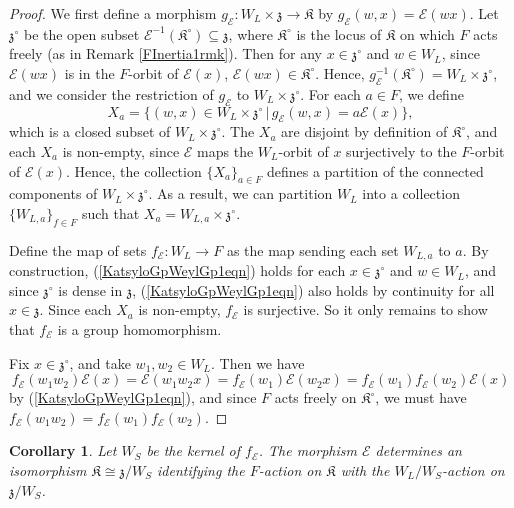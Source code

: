 \documentclass{amsart}
\newtheorem{corollary}[theorem]{Corollary}
\theoremstyle{remark}
\numberwithin{theorem}{section}
\numberwithin{equation}{section}
\begin{document}
\begin{proof}
We first define a morphism $g_{\mathcal E}:W_L \times \mathfrak{z} \rightarrow \mathfrak{K}$ by $g_{\mathcal E}(w,x) = \mathcal E(wx)$. Let $\mathfrak{z}^\circ$ be the open subset $\mathcal{E}^{-1}(\mathfrak{K}^\circ) \subseteq \mathfrak{z}$, where $\mathfrak{K}^\circ$ is the locus of $\mathfrak{K}$ on which $F$ acts freely (as in Remark \ref{FInertia1rmk}). Then for any $x \in \mathfrak{z}^\circ$ and $w \in W_L$, since $\mathcal E(wx)$ is in the $F$-orbit of $\mathcal E(x)$, $\mathcal E(wx) \in \mathfrak{K}^\circ$. Hence, $g_{\mathcal E}^{-1}(\mathfrak{K}^\circ) = W_L \times \mathfrak{z}^\circ$, and we consider the restriction of $g_{\mathcal E}$ to $W_L \times \mathfrak{z}^\circ$. For each $a \in F$, we define
\begin{equation}\label{KatsyloGpWeylGp2eqn}
    X_a = \{ (w,x) \in W_L \times \mathfrak{z}^\circ \, | \, g_{\mathcal E}(w,x) = a\mathcal E(x) \},
\end{equation}
which is a closed subset of $W_L \times \mathfrak{z}^\circ$. The $X_a$ are disjoint by definition of $\mathfrak{K}^\circ$, and each $X_a$ is non-empty, since $\mathcal E$ maps the $W_L$-orbit of $x$ surjectively to the $F$-orbit of $\mathcal E(x)$. Hence, the collection $\{X_a\}_{a \in F}$ defines a partition of the connected components of $W_L \times \mathfrak{z}^\circ$. As a result, we can partition $W_L$ into a collection $\{W_{L,a}\}_{f \in F}$ such that $X_a = W_{L,a} \times \mathfrak{z}^\circ$.

Define the map of sets $f_{\mathcal E}:W_L \rightarrow F$ as the map sending each set $W_{L,a}$ to $a$. By construction, (\ref{KatsyloGpWeylGp1eqn}) holds for each $x \in \mathfrak{z}^\circ$ and $w \in W_L$, and since $\mathfrak{z}^\circ$ is dense in $\mathfrak{z}$, (\ref{KatsyloGpWeylGp1eqn}) also holds by continuity for all $x \in \mathfrak{z}$. Since each $X_a$ is non-empty, $f_{\mathcal E}$ is surjective. So it only remains to show that $f_{\mathcal E}$ is a group homomorphism.

Fix $x \in \mathfrak{z}^\circ$, and take $w_1, w_2 \in W_L$. Then we have
$$
f_{\mathcal E}(w_1w_2)\mathcal E(x) = \mathcal E(w_1w_2x) = f_{\mathcal E}(w_1)\mathcal E(w_2x) = f_{\mathcal E}(w_1)f_{\mathcal E}(w_2)\mathcal E(x)
$$
by (\ref{KatsyloGpWeylGp1eqn}), and since $F$ acts freely on $\mathfrak{K}^\circ$, we must have $f_{\mathcal E}(w_1w_2)=f_{\mathcal E}(w_1)f_{\mathcal E}(w_2)$.
\end{proof}

\begin{corollary}\label{KatsyloGpWeylGpcor}
    Let $W_S$ be the kernel of $f_\mathcal E$. The morphism $\mathcal E$ determines an isomorphism $\mathfrak{K} \cong \mathfrak{z}/W_S$ identifying the $F$-action on $\mathfrak{K}$ with the $W_L/W_S$-action on $\mathfrak{z}/W_S$. 
\end{corollary}
\end{document}
